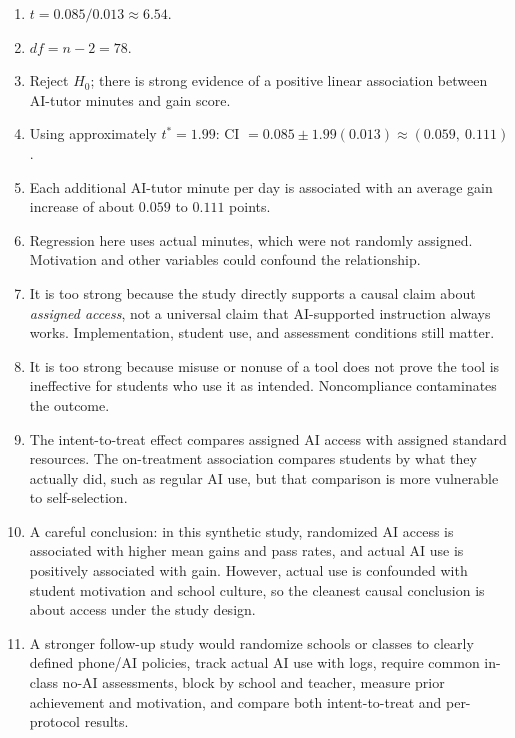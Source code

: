 \documentclass[11pt]{article}
\begin{document}
\begin{enumerate}[leftmargin=*]
\item $t = 0.085 / 0.013 \approx 6.54$.

\item $df = n - 2 = 78$.

\item Reject $H_0$; there is strong evidence of a positive linear
association between AI-tutor minutes and gain score.

\item Using approximately $t^* = 1.99$:
CI $= 0.085 \pm 1.99(0.013) \approx (0.059,\ 0.111)$.

\item Each additional AI-tutor minute per day is associated with an
average gain increase of about $0.059$ to $0.111$ points.

\item Regression here uses actual minutes, which were not randomly
assigned. Motivation and other variables could confound the
relationship.

\item It is too strong because the study directly supports a causal
claim about \emph{assigned access}, not a universal claim that
AI-supported instruction always works. Implementation, student
use, and assessment conditions still matter.

\item It is too strong because misuse or nonuse of a tool does not
prove the tool is ineffective for students who use it as intended.
Noncompliance contaminates the outcome.

\item The intent-to-treat effect compares assigned AI access with
assigned standard resources. The on-treatment association
compares students by what they actually did, such as regular AI
use, but that comparison is more vulnerable to self-selection.

\item A careful conclusion: in this synthetic study, randomized AI
access is associated with higher mean gains and pass rates, and
actual AI use is positively associated with gain. However, actual
use is confounded with student motivation and school culture, so
the cleanest causal conclusion is about access under the study
design.

\item A stronger follow-up study would randomize schools or classes
to clearly defined phone/AI policies, track actual AI use with
logs, require common in-class no-AI assessments, block by school
and teacher, measure prior achievement and motivation, and
compare both intent-to-treat and per-protocol results.
\end{enumerate}
\end{document}
